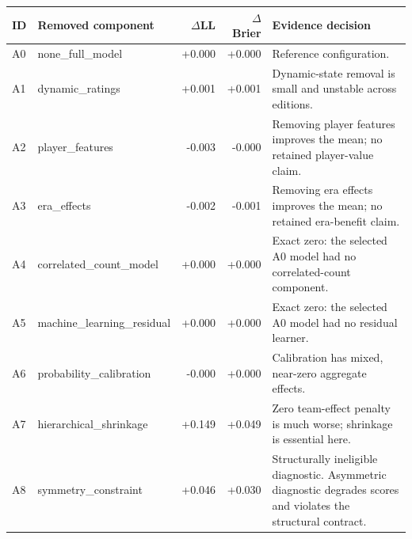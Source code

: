 \begin{tabularx}{\linewidth}{@{}llrrY@{}}
\toprule
ID & Removed component & $\Delta$LL & $\Delta$Brier & Evidence decision \\
\midrule
A0 & none\_full\_model & +0.000 & +0.000 & Reference configuration. \\
A1 & dynamic\_ratings & +0.001 & +0.001 & Dynamic-state removal is small and unstable across editions. \\
A2 & player\_features & -0.003 & -0.000 & Removing player features improves the mean; no retained player-value claim. \\
A3 & era\_effects & -0.002 & -0.001 & Removing era effects improves the mean; no retained era-benefit claim. \\
A4 & correlated\_count\_model & +0.000 & +0.000 & Exact zero: the selected A0 model had no correlated-count component. \\
A5 & machine\_learning\_residual & +0.000 & +0.000 & Exact zero: the selected A0 model had no residual learner. \\
A6 & probability\_calibration & -0.000 & +0.000 & Calibration has mixed, near-zero aggregate effects. \\
A7 & hierarchical\_shrinkage & +0.149 & +0.049 & Zero team-effect penalty is much worse; shrinkage is essential here. \\
A8 & symmetry\_constraint & +0.046 & +0.030 & Structurally ineligible diagnostic. Asymmetric diagnostic degrades scores and violates the structural contract. \\
\bottomrule
\end{tabularx}
